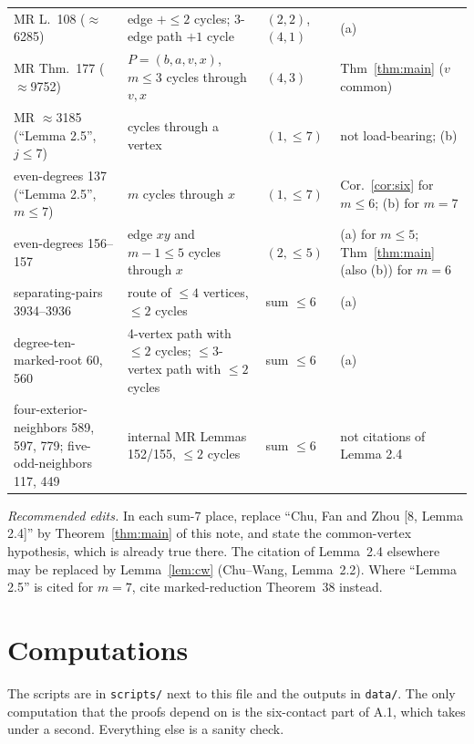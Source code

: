 \documentclass[11pt]{amsart}
\theoremstyle{definition}
\theoremstyle{remark}
\begin{document}
\begin{longtable}{L{3.4cm}L{5.0cm}L{1.4cm}L{4.4cm}}
MR L.~108 ($\approx$6285) & edge $+\le2$ cycles; 3-edge path $+1$ cycle & $(2,2)$, $(4,1)$ & (a)\\
MR Thm.~177 ($\approx$9752) & $P=(b,a,v,x)$, $m\le3$ cycles through $v,x$ & $(4,3)$ & Thm~\ref{thm:main} ($v$ common)\\
MR $\approx$3185 (``Lemma 2.5'', $j\le7$) & cycles through a vertex & $(1,\le7)$ & not load-bearing; (b)\\
even-degrees 137 (``Lemma 2.5'', $m\le7$) & $m$ cycles through $x$ & $(1,\le7)$ & Cor.~\ref{cor:six} for $m\le6$; (b) for $m=7$\\
even-degrees 156--157 & edge $xy$ and $m-1\le5$ cycles through $x$ & $(2,\le5)$ & (a) for $m\le5$; Thm~\ref{thm:main} (also (b)) for $m=6$\\
separating-pairs 3934--3936 & route of $\le4$ vertices, $\le2$ cycles & sum $\le6$ & (a)\\
degree-ten-marked-root 60, 560 & 4-vertex path with $\le2$ cycles; $\le3$-vertex path with $\le2$ cycles & sum $\le6$ & (a)\\
four-exterior-neighbors 589, 597, 779; five-odd-neighbors 117, 449 & internal MR Lemmas 152/155, $\le2$ cycles & sum $\le6$ & not citations of Lemma 2.4\\
\bottomrule
\end{longtable}

\noindent\emph{Recommended edits.} In each sum-$7$ place, replace ``Chu, Fan and Zhou [8, Lemma
2.4]'' by Theorem~\ref{thm:main} of this note, and state the common-vertex hypothesis, which is
already true there. The citation of Lemma~2.4 elsewhere may be replaced by Lemma~\ref{lem:cw}
(Chu--Wang, Lemma~2.2). Where ``Lemma 2.5'' is cited for $m=7$, cite marked-reduction Theorem~38
instead.

\appendix
\section{Computations}\label{app:comp}

The scripts are in \texttt{scripts/} next to this file and the outputs in \texttt{data/}. The only
computation that the proofs depend on is the six-contact part of A.1, which takes under a second.
Everything else is a sanity check.
\end{document}
